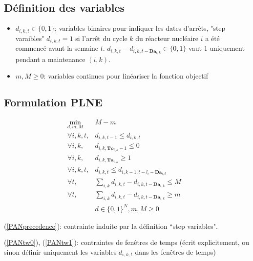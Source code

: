 \documentclass[a4paper,11pt]{article}
\begin{document}
    \subsection{Définition des variables}

    \begin{itemize}
     \item $d_{i,k,t}\in \{0,1\}$; variables binaires pour indiquer les dates d'arrêts, "step varaibles" 
    $d_{i,k,t}=1$ si l'arrêt du cycle $k$ du réacteur nucléaire $i$ a été commencé avant la semaine $t$.
    $d_{i,k,t}-d_{i,k,t- {\mathbf{Da}_{i,k}}} \in \{0,1\}$ vaut $1$ uniquement pendant a maintenance $(i,k)$.


     \item $m,M\geqslant 0$: variables continues pour linéariser la fonction objectif
    \end{itemize}


    \subsection{Formulation PLNE}


    \begin{eqnarray}
    \displaystyle \min_{d,m,M} & M-m
     & \\
    \forall i , k, t, & d_{i,k,t-1}\leqslant d_{i,k,t} & \label{PANprecedence}\\
    \forall i , k, & d_{i,k,\mathbf{To}_{i,k}-1}\leqslant 0 & \label{PANtw0} \\
    \forall i , k, & d_{i,k,\mathbf{Ta}_{i,k}}\geqslant 1 & \label{PANtw1}\\
    \forall i , k, t, & d_{i,k,t}\leqslant d_{i,k-1,t-l_i-\mathbf{Da}_{i,k}} & \label{PANprecedence2}\\
    \forall t, & \displaystyle \sum_{i,k} d_{i,k,t}-d_{i,k,t- {\mathbf{Da}_{i,k}}} \leqslant M & \label{maxMaint}\\
    \forall t, & \displaystyle \sum_{i,k} d_{i,k,t}-d_{i,k,t- {\mathbf{Da}_{i,k}}} \geqslant m & \label{minMaint}\\
    & d \in \{0,1\}^N, m,M \geqslant 0
    \end{eqnarray}

    (\ref{PANprecedence}): contrainte induite par la définition ``step variables".

    (\ref{PANtw0}), (\ref{PANtw1}): contraintes de fenêtres de temps (écrit explicitement, ou sinon définir uniquement les variables $d_{i,k,t}$
    dans les fenêtres de temps)
\end{document}

